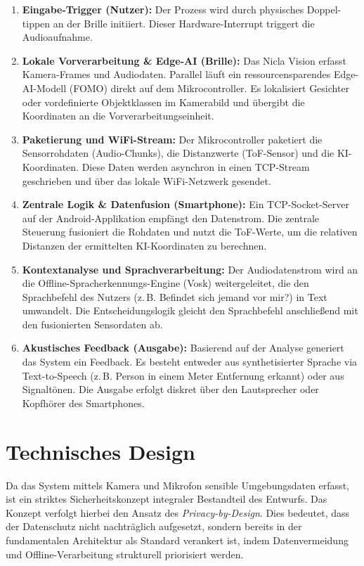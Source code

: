 \begin{enumerate}
    \item \textbf{Eingabe-Trigger (Nutzer):} Der Prozess wird durch physisches Doppel-tippen an der Brille initiiert. Dieser Hardware-Interrupt triggert die Audioaufnahme.
    \item \textbf{Lokale Vorverarbeitung \& Edge-AI (Brille):} Das Nicla Vision erfasst Kamera-Frames und Audiodaten. Parallel läuft ein ressourcensparendes Edge-AI-Modell (FOMO) direkt auf dem Mikrocontroller. Es lokalisiert Gesichter oder vordefinierte Objektklassen im Kamerabild und übergibt die Koordinaten an die Vorverarbeitungseinheit.
    \item \textbf{Paketierung und WiFi-Stream:} Der Mikrocontroller paketiert die Sensorrohdaten (Audio-Chunks), die Distanzwerte (ToF-Sensor) und die KI-Koordinaten. Diese Daten werden asynchron in einen TCP-Stream geschrieben und über das lokale WiFi-Netzwerk gesendet.
    \item \textbf{Zentrale Logik \& Datenfusion (Smartphone):} Ein TCP-Socket-Server auf der Android-Applikation empfängt den Datenstrom. Die zentrale Steuerung fusioniert die Rohdaten und nutzt die ToF-Werte, um die relativen Distanzen der ermittelten KI-Koordinaten zu berechnen.
    \item \textbf{Kontextanalyse und Sprachverarbeitung:} Der Audiodatenstrom wird an die Offline-Spracherkennungs-Engine (Vosk) weitergeleitet, die den Sprachbefehl des Nutzers (z.\,B. \glqq Befindet sich jemand vor mir?\grqq) in Text umwandelt. Die Entscheidungslogik gleicht den Sprachbefehl anschließend mit den fusionierten Sensordaten ab.
    \item \textbf{Akustisches Feedback (Ausgabe):} Basierend auf der Analyse generiert das System ein Feedback. Es besteht entweder aus synthetisierter Sprache via Text-to-Speech (z.\,B. \glqq Person in einem Meter Entfernung erkannt\grqq) oder aus Signaltönen. Die Ausgabe erfolgt diskret über den Lautsprecher oder Kopfhörer des Smartphones.
\end{enumerate}

\section{Technisches Design}
Da das System mittels Kamera und Mikrofon sensible Umgebungsdaten erfasst, ist ein striktes Sicherheitskonzept integraler Bestandteil des Entwurfs. Das Konzept verfolgt hierbei den Ansatz des \textit{Privacy-by-Design}. Dies bedeutet, dass der Datenschutz nicht nachträglich aufgesetzt, sondern bereits in der fundamentalen Architektur als Standard verankert ist, indem Datenvermeidung und Offline-Verarbeitung strukturell priorisiert werden.

